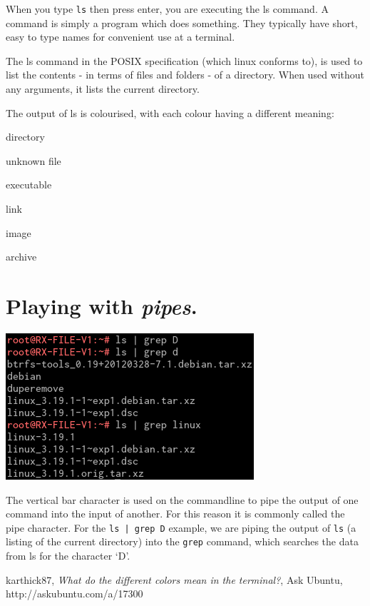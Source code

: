 \documentclass[11pt,twoside,a4paper]{article}
\begin{document}
When you type \verb|ls| then press enter, you are executing the ls command. A command is simply a program which does something. They typically have short, easy to type names for convenient use at a terminal.

The ls command in the POSIX specification (which linux conforms to), is used to list the contents - in terms of files and folders - of a directory. When used without any arguments, it lists the current directory.

\pagebreak
The output of ls is colourised, with each colour having a different meaning:\cite{ls-colours}
\begin{description}[leftmargin=!,labelwidth=\widthof{\bfseries Light Blue}]
  \item[Blue] directory
  \item[White] unknown file
  \item[Green] executable
  \item[Light Blue] link
  \item[Pink] image
  \item[Red] archive
\end{description}

\section{Playing with \emph{pipes}.}

\includegraphics{ls-grep}

The vertical bar character is used on the commandline to pipe the output of one command into the input of another. For this reason it is commonly called the pipe character. For the \verb!ls | grep D! example, we are piping the output of \verb|ls| (a listing of the current directory) into the \verb|grep| command, which searches the data from ls for the character `D'.

\newpage
\begin{thebibliography}{9}

  karthick87,
  \emph{What do the different colors mean in the terminal?},
  Ask Ubuntu,
  http://askubuntu.com/a/17300

\end{thebibliography}
\end{document}
